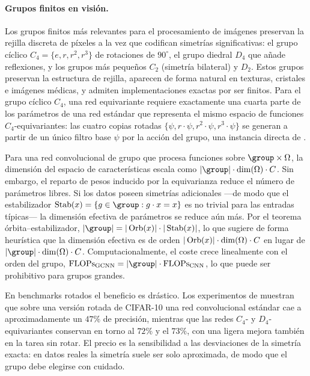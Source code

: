 \paragraph{Grupos finitos en visi\'on.}
Los grupos finitos m\'as relevantes para el procesamiento de im\'agenes preservan
la rejilla discreta de p\'ixeles a la vez que codifican simetr\'ias
significativas: el grupo c\'iclico $C_4 = \{e, r, r^2, r^3\}$ de rotaciones de
$90^\circ$, el grupo diedral $D_4$ que a\~nade reflexiones, y los grupos m\'as
peque\~nos $C_2$ (simetr\'ia bilateral) y $D_2$. Estos grupos preservan la
estructura de rejilla, aparecen de forma natural en texturas, cristales e
im\'agenes m\'edicas, y admiten implementaciones exactas por ser finitos. Para el
grupo c\'iclico $C_4$, una red equivariante requiere exactamente una cuarta parte
de los par\'ametros de una red est\'andar que representa el mismo espacio de
funciones $C_4$-equivariantes: las cuatro copias rotadas $\{\psi, r\cdot\psi,
r^2\cdot\psi, r^3\cdot\psi\}$ se generan a partir de un \'unico filtro base
$\psi$ por la acci\'on del grupo, una instancia directa de
.

\begin{remark}
\label{rem:groups:tradeoff}
Para una red convolucional de grupo que procesa funciones sobre $\group \times
\Omega$, la dimensi\'on del espacio de caracter\'isticas escala como $|\group|
\cdot \dim(\Omega) \cdot C$. Sin embargo, el reparto de pesos inducido por la
equivarianza reduce el n\'umero de par\'ametros libres. Si los datos poseen
simetr\'ias adicionales ---de modo que el estabilizador $\Stab(x) = \{g \in
\group : g \cdot x = x\}$ es no trivial para las entradas t\'ipicas--- la
dimensi\'on efectiva de par\'ametros se reduce a\'un m\'as. Por el teorema
\'orbita--estabilizador, $|\group| = |\Orb(x)| \cdot |\Stab(x)|$, lo que sugiere
de forma heur\'istica que la dimensi\'on efectiva es de orden $|\operatorname{Orb}(x)| \cdot
\dim(\Omega) \cdot C$ en lugar de $|\group| \cdot \dim(\Omega) \cdot C$.
Computacionalmente, el coste crece linealmente con el orden del grupo,
$\text{FLOPs}_{\text{GCNN}} = |\group| \cdot \text{FLOPs}_{\text{CNN}}$, lo que
puede ser prohibitivo para grupos grandes.
\end{remark}

En benchmarks rotados el beneficio es dr\'astico. Los experimentos de
\citet{cohen2016group} muestran que sobre una versi\'on rotada de CIFAR-10 una
red convolucional est\'andar cae a aproximadamente un $47\%$ de precisi\'on,
mientras que las redes $C_4$- y $D_4$-equivariantes conservan en torno al $72\%$
y el $73\%$, con una ligera mejora tambi\'en en la tarea sin rotar. El precio es
la sensibilidad a las desviaciones de la simetr\'ia exacta: en datos reales la
simetr\'ia suele ser solo aproximada, de modo que el grupo debe elegirse con
cuidado.

